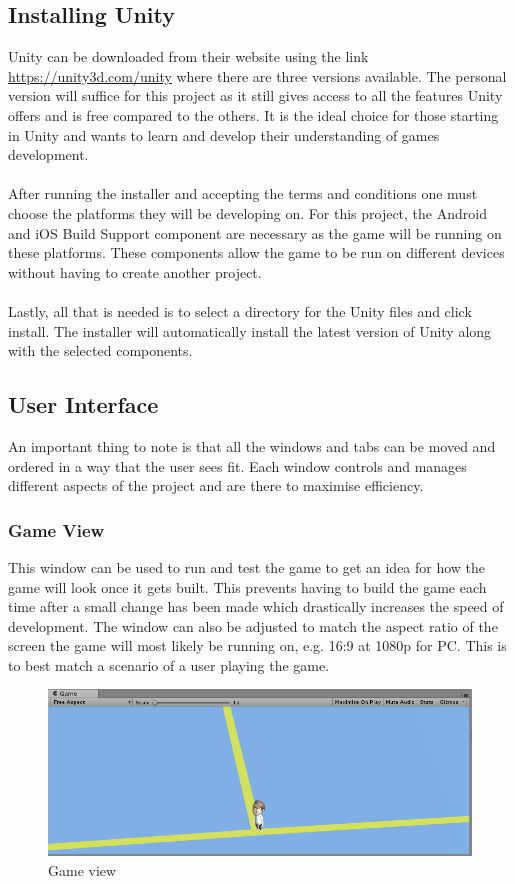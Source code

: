 \documentclass[a4paper]{report}
\begin{document}
\subsection{Installing Unity}
Unity can be downloaded from their website using the link {\url{https://unity3d.com/unity}} where there are three versions available. The personal version will suffice for this project as it still gives access to all the features Unity offers and is free compared to the others. It is the ideal choice for those starting in Unity and wants to learn and develop their understanding of games development.  
\\\\
After running the installer and accepting the terms and conditions one must choose the platforms they will be developing on. For this project, the Android and iOS Build Support component are necessary as the game will be running on these platforms. These components allow the game to be run on different devices without having to create another project.
\\\\
Lastly, all that is needed is to select a directory for the Unity files and click install. The installer will automatically install the latest version of Unity along with the selected components.

\subsection{User Interface}
An important thing to note is that all the windows and tabs can be moved and ordered in a way that the user sees fit. Each window controls and manages different aspects of the project and are there to maximise efficiency.

\subsubsection{Game View}
This window can be used to run and test the game to get an idea for how the game will look once it gets built. This prevents having to build the game each time after a small change has been made which drastically increases the speed of development. The window can also be adjusted to match the aspect ratio of the screen the game will most likely be running on, e.g. 16:9 at 1080p for PC. This is to best match a scenario of a user playing the game. \cite{Unity}
\begin{figure}[h]
\centering
\includegraphics[scale=0.7]{"game view"}
\caption{Game view}
\end{figure}
\end{document}
